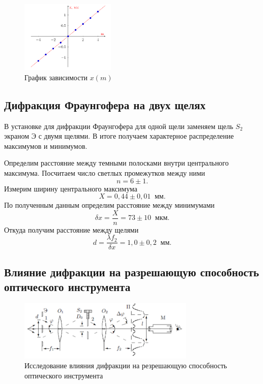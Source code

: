 \documentclass[a4paper]{article}
\begin{document}
\begin{figure}[ht!]
    \centering
    \includegraphics[width = 0.40\textwidth]{image/pic5.png}
    \caption{График зависимости $x(m)$}
\end{figure}

\subsection{Дифракция Фраунгофера на двух щелях}

В установке для дифракции Фраунгофера для одной щели заменяем щель $S_2$ экраном Э с двумя щелями. В итоге получаем характерное распределение максимумов и минимумов.

\noindent Определим расстояние между темными полосками внутри центрального максимума. Посчитаем число светлых промежутков между ними $$n = 6 \pm 1.$$ Измерим ширину центрального максимума $$X = 0,44 \pm 0,01 \;\; \text{мм}.$$ По полученным данным определим расстояние между минимумами $$\delta x = \frac{X}{n} = 73 \pm 10 \;\;\text{мкм}.$$ Откуда получим расстояние между щелями $$d = \frac{\lambda f_2}{\delta x} = 1,0 \pm 0,2 \;\;\text{мм}.$$

\subsection{Влияние дифракции на разрешающую способность оптического инструмента}

\begin{figure}[ht!]
    \centering
    \includegraphics[width = 0.75\textwidth]{image/pic3.png}
    \caption{Исследование влияния дифракции на резрешающую способность оптического инструмента}
\end{figure}
\end{document}
